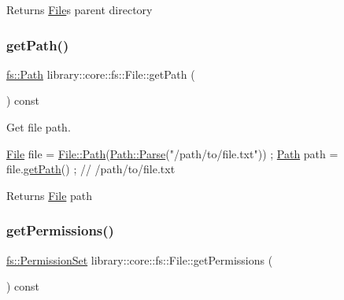 \begin{DoxyReturn}{Returns}
\hyperlink{classlibrary_1_1core_1_1fs_1_1File}{File}\textquotesingle{}s parent directory 
\end{DoxyReturn}
\mbox{\label{classlibrary_1_1core_1_1fs_1_1File_a70b1380ff844adf37a481bbdb46d11a0}} 
\subsubsection{\texorpdfstring{get\+Path()}{getPath()}}
{\footnotesize\ttfamily \hyperlink{classlibrary_1_1core_1_1fs_1_1Path}{fs\+::\+Path} library\+::core\+::fs\+::\+File\+::get\+Path (\begin{DoxyParamCaption}{ }\end{DoxyParamCaption}) const}



Get file path. 


\begin{DoxyCode}
\hyperlink{classlibrary_1_1core_1_1fs_1_1File_a7490060f19a21d4ee58bb6cec87a1ca6}{File} file = \hyperlink{classlibrary_1_1core_1_1fs_1_1File_a0e0d8a8becb3cdd21775554e181452d8}{File::Path}(\hyperlink{classlibrary_1_1core_1_1fs_1_1Path_aebf5bd3af83e0b7376616e146f3e55df}{Path::Parse}(\textcolor{stringliteral}{"/path/to/file.txt"})) ;
\hyperlink{classlibrary_1_1core_1_1fs_1_1File_a0e0d8a8becb3cdd21775554e181452d8}{Path} path = file.\hyperlink{classlibrary_1_1core_1_1fs_1_1File_a70b1380ff844adf37a481bbdb46d11a0}{getPath}() ; \textcolor{comment}{// /path/to/file.txt}
\end{DoxyCode}


\begin{DoxyReturn}{Returns}
\hyperlink{classlibrary_1_1core_1_1fs_1_1File}{File} path 
\end{DoxyReturn}
\mbox{\label{classlibrary_1_1core_1_1fs_1_1File_a0addf18f7510955e48fdef2416b98423}} 
\subsubsection{\texorpdfstring{get\+Permissions()}{getPermissions()}}
{\footnotesize\ttfamily \hyperlink{classlibrary_1_1core_1_1fs_1_1PermissionSet}{fs\+::\+Permission\+Set} library\+::core\+::fs\+::\+File\+::get\+Permissions (\begin{DoxyParamCaption}{ }\end{DoxyParamCaption}) const}



